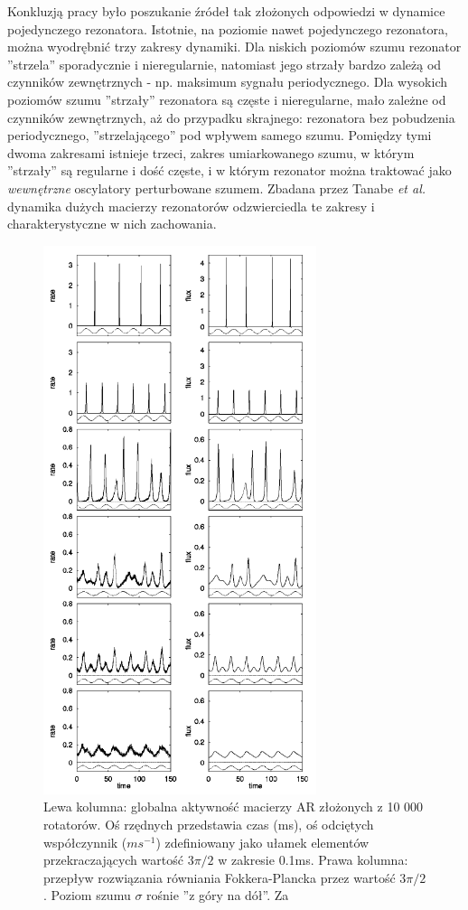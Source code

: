   Konkluzją pracy było poszukanie źródeł tak złożonych odpowiedzi w dynamice pojedynczego rezonatora. Istotnie, na poziomie nawet pojedynczego rezonatora, można wyodrębnić trzy zakresy dynamiki. Dla niskich poziomów szumu rezonator ''strzela'' sporadycznie i nieregularnie, natomiast jego strzały bardzo zależą od czynników zewnętrznych - np. maksimum sygnału periodycznego. Dla wysokich poziomów szumu ''strzały'' rezonatora są częste i nieregularne, mało zależne od czynników zewnętrznych, aż do przypadku skrajnego: rezonatora bez pobudzenia periodycznego, ''strzelającego'' pod wpływem samego szumu. Pomiędzy tymi dwoma zakresami istnieje trzeci, zakres umiarkowanego szumu, w którym ''strzały'' są regularne i dość częste, i w którym rezonator można traktować jako \emph{wewnętrzne} oscylatory perturbowane szumem. Zbadana przez Tanabe \emph{et al.} dynamika dużych macierzy rezonatorów odzwierciedla te zakresy i charakterystyczne w nich zachowania.

  \begin{figure}
    \includegraphics[width=80mm]{images/tanabe.png}
    \caption{Lewa kolumna: globalna aktywność macierzy AR złożonych z 10 000 rotatorów. Oś rzędnych przedstawia czas (ms), oś odciętych współczynnik ($ms^{-1}$) zdefiniowany jako ułamek elementów przekraczających wartość $3 \pi / 2$ w zakresie 0.1ms. Prawa kolumna: przepływ rozwiązania równiania Fokkera-Plancka przez wartość $3 \pi / 2$. Poziom szumu $\sigma$ rośnie ''z góry na dół''. Za \cite{tanabe_shimokawa}}
    \label{fig:graphics:tanabe}
  \end{figure}

